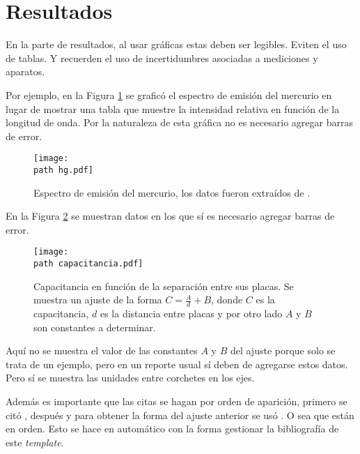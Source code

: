 \section*{Resultados}
\label{sec:Resultados}

En la parte de resultados, al usar gráficas estas deben ser legibles. Eviten el uso de tablas. Y recuerden el uso de incertidumbres asociadas a mediciones y aparatos.

Por ejemplo, en la Figura \ref{fig:Hg} se graficó el espectro de emisión del mercurio en lugar de mostrar una tabla que muestre la intensidad relativa en función de la longitud de onda. Por la naturaleza de esta gráfica no es necesario agregar barras de error.

\begin{figure}[H]
	\centering
	\texttt{[image: \\path hg.pdf]}
	\caption{Espectro de emisión del mercurio, los datos fueron extraídos de \cite{nistHg}.}
	\label{fig:Hg}
\end{figure}

En la Figura \ref{fig:Capacitancia} se muestran datos en los que sí es necesario agregar barras de error. 

\begin{figure}[H]
	\centering
	\texttt{[image: \\path capacitancia.pdf]}
	\caption{Capacitancia en función de la separación entre sus placas. Se muestra un ajuste de la forma $ C = \frac{A}{d} + B $, donde $ C $ es la capacitancia, $ d $ es la distancia entre placas y por otro lado $ A $ y $ B $ son constantes a determinar.}
	\label{fig:Capacitancia}
\end{figure}

Aquí no se muestra el valor de las constantes $ A $ y $ B $ del ajuste porque solo se trata de un ejemplo, pero en un reporte usual sí deben de agregarse estos datos. Pero sí se muestra las unidades entre corchetes en los ejes. 

Además es importante que las citas se hagan por orden de aparición, primero se citó \cite{wheeler1955}, después \cite{nistHg} y para obtener la forma del ajuste anterior se usó \cite{griffithsElectrodynamics}. O sea que están en orden. Esto se hace en automático con la forma gestionar la bibliografía de este \textit{template}.